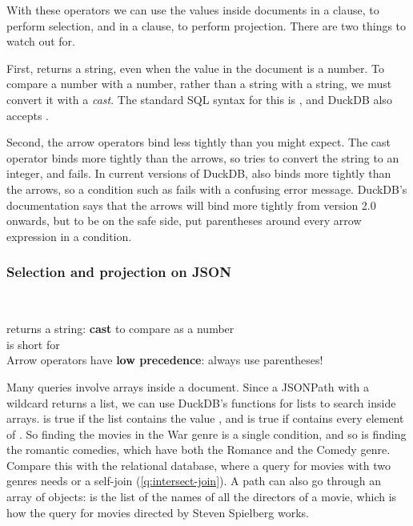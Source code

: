 With these operators we can use the values inside documents in a  clause, to perform selection, and in a  clause, to perform projection.
There are two things to watch out for.

First, \code{->>} returns a string, even when the value in the document is a number.
To compare a number with a number, rather than a string with a string, we must convert it with a \emph{cast}.
The standard SQL syntax for this is , and DuckDB also accepts .

Second, the arrow operators bind less tightly than you might expect.
The cast operator \code{::} binds more tightly than the arrows, so  tries to convert the string  to an integer, and fails.
In current versions of DuckDB,  also binds more tightly than the arrows, so a condition such as  fails with a confusing error message.
DuckDB's documentation says that the arrows will bind more tightly from version 2.0 onwards, but to be on the safe side, put parentheses around every arrow expression in a condition.

\begin{frame}
    \label{s:json-where}
    \frametitle{Selection and projection on JSON}
    \inputminted[fontsize=\footnotesize]{sql}{code/json-where.sql}
    \vspace{0.3em}
    {\footnotesize}\\[0.8em]\pause
    \code{->>} returns a string: \textbf{cast} to compare as a number\\
    \hspace*{1em} is short for \\[0.6em]\pause
    \emojiwarning{}
    Arrow operators have \textbf{low precedence}: always use parentheses!
\end{frame}
\label{l:json-where}

Many queries involve arrays inside a document.
Since a JSONPath with a wildcard returns a list, we can use DuckDB's functions for lists to search inside arrays.
 is true if the list  contains the value , and  is true if  contains every element of .
So finding the movies in the War genre is a single condition, and so is finding the romantic comedies, which have both the Romance and the Comedy genre.
Compare this with the relational database, where a query for movies with two genres needs  or a self-join (\autoref{q:intersect-join}).
A path can also go through an array of objects:  is the list of the names of all the directors of a movie, which is how the query for movies directed by Steven Spielberg works.

